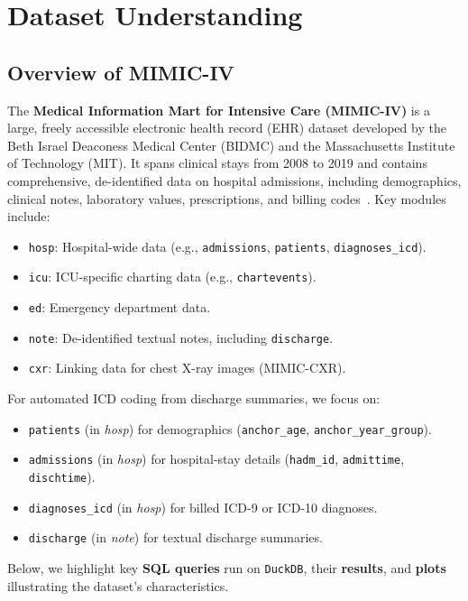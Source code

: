 \chapter{Dataset Understanding}

\section{Overview of MIMIC-IV}
The \textbf{Medical Information Mart for Intensive Care (MIMIC-IV)} is a large, freely accessible electronic health record (EHR) dataset developed by the Beth Israel Deaconess Medical Center (BIDMC) and the Massachusetts Institute of Technology (MIT). It spans clinical stays from 2008 to 2019 and contains comprehensive, de-identified data on hospital admissions, including demographics, clinical notes, laboratory values, prescriptions, and billing codes~\cite{johnson2023mimicivscidata,nguyen2023mimicivicd}. Key modules include:
\begin{itemize}
    \item \texttt{hosp}: Hospital-wide data (e.g., \texttt{admissions}, \texttt{patients}, \texttt{diagnoses\_icd}).
    \item \texttt{icu}: ICU-specific charting data (e.g., \texttt{chartevents}).
    \item \texttt{ed}: Emergency department data.
    \item \texttt{note}: De-identified textual notes, including \texttt{discharge}.
    \item \texttt{cxr}: Linking data for chest X-ray images (MIMIC-CXR).
\end{itemize}
For automated ICD coding from discharge summaries, we focus on:
\begin{itemize}
    \item \texttt{patients} (in \textit{hosp}) for demographics (\texttt{anchor\_age}, \texttt{anchor\_year\_group}).
    \item \texttt{admissions} (in \textit{hosp}) for hospital-stay details (\texttt{hadm\_id}, \texttt{admittime}, \texttt{dischtime}).
    \item \texttt{diagnoses\_icd} (in \textit{hosp}) for billed ICD-9 or ICD-10 diagnoses.
    \item \texttt{discharge} (in \textit{note}) for textual discharge summaries.
\end{itemize}

\vspace{0.2cm}
\noindent
Below, we highlight key \textbf{SQL queries} run on \texttt{DuckDB}, their \textbf{results}, and \textbf{plots} illustrating the dataset's characteristics.

